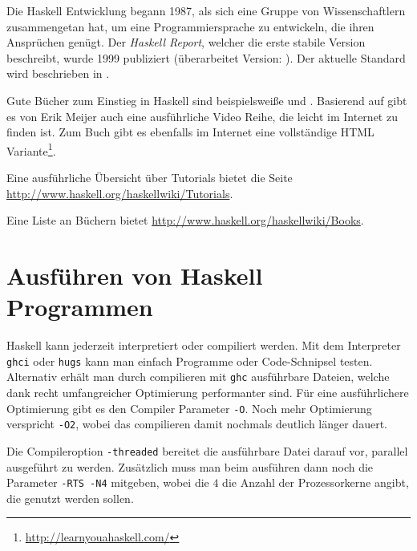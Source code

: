 Die Haskell Entwicklung begann 1987, als sich eine Gruppe von Wissenschaftlern
zusammengetan hat, um eine Programmiersprache zu entwickeln, die ihren
Ansprüchen genügt. Der \emph{Haskell Report}, welcher die erste stabile Version
beschreibt, wurde 1999 publiziert (überarbeitet Version: \cite{haskell98}).
Der aktuelle Standard wird beschrieben in \cite{haskell2010}.

Gute Bücher zum Einstieg in Haskell sind beispielsweiße \cite{Hutton} und
\cite{lyahfgg}.
Basierend auf \cite{Hutton} gibt es von Erik Meijer auch eine ausführliche
Video Reihe, die leicht im Internet zu finden ist.
Zum Buch \cite{lyahfgg} gibt es ebenfalls im Internet eine vollständige HTML
Variante\footnote{\url{http://learnyouahaskell.com/}}.

Eine ausführliche Übersicht über Tutorials bietet die Seite
\url{http://www.haskell.org/haskellwiki/Tutorials}.

Eine Liste an Büchern bietet \url{http://www.haskell.org/haskellwiki/Books}.

\section{Ausführen von Haskell Programmen}

Haskell kann jederzeit interpretiert oder compiliert werden. Mit dem
Interpreter \texttt{ghci} oder \texttt{hugs} kann man einfach Programme oder
Code-Schnipsel testen.
Alternativ erhält man durch compilieren mit \texttt{ghc} ausführbare Dateien,
welche dank recht umfangreicher Optimierung performanter sind. Für eine
ausführlichere Optimierung gibt es den Compiler Parameter \texttt{-O}. Noch
mehr Optimierung verspricht \texttt{-O2}, wobei das compilieren damit
nochmals deutlich länger dauert.

Die Compileroption \texttt{-threaded} bereitet die ausführbare Datei darauf
vor, parallel ausgeführt zu werden. Zusätzlich muss man beim ausführen dann
noch die Parameter \texttt{-RTS -N4} mitgeben, wobei die $4$ die Anzahl der
Prozessorkerne angibt, die genutzt werden sollen.


